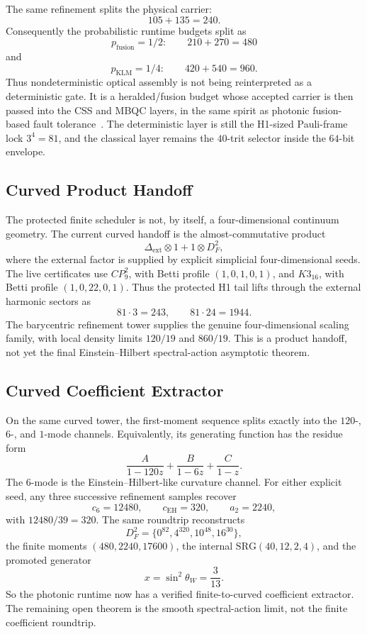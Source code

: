 ﻿\documentclass[12pt]{article}
\begin{document}
The same refinement splits the physical carrier:
\[
105+135=240.
\]
Consequently the probabilistic runtime budgets split as
\[
p_{\mathrm{fusion}}=1/2:\qquad 210+270=480
\]
and
\[
p_{\mathrm{KLM}}=1/4:\qquad 420+540=960.
\]
Thus nondeterministic optical assembly is not being reinterpreted as a
deterministic gate.  It is a heralded/fusion budget whose accepted carrier is
then passed into the CSS and MBQC layers, in the same spirit as photonic fusion-based fault tolerance~\cite{Bartolucci2021}.  The deterministic layer is
still the H1-sized Pauli-frame lock \(3^4=81\), and the classical layer remains
the \(40\)-trit selector inside the \(64\)-bit envelope.

\subsection{Curved Product Handoff}

The protected finite scheduler is not, by itself, a four-dimensional continuum
geometry.  The current curved handoff is the almost-commutative product
\[
\Delta_{\mathrm{ext}}\otimes 1 + 1\otimes D_F^2,
\]
where the external factor is supplied by explicit simplicial four-dimensional
seeds.  The live certificates use \(CP^2_9\), with Betti profile
\((1,0,1,0,1)\), and \(K3_{16}\), with Betti profile \((1,0,22,0,1)\).  Thus the
protected H1 tail lifts through the external harmonic sectors as
\[
81\cdot 3=243,\qquad 81\cdot 24=1944.
\]
The barycentric refinement tower supplies the genuine four-dimensional scaling
family, with local density limits \(120/19\) and \(860/19\).  This is a product
handoff, not yet the final Einstein--Hilbert spectral-action asymptotic theorem.

\subsection{Curved Coefficient Extractor}

On the same curved tower, the first-moment sequence splits exactly into the
\(120\)-, \(6\)-, and \(1\)-mode channels.  Equivalently, its generating function
has the residue form
\[
\frac{A}{1-120z}+\frac{B}{1-6z}+\frac{C}{1-z}.
\]
The \(6\)-mode is the Einstein--Hilbert-like curvature channel.  For either
explicit seed, any three successive refinement samples recover
\[
c_6=12480,\qquad c_{\mathrm{EH}}=320,\qquad a_2=2240,
\]
with \(12480/39=320\).  The same roundtrip reconstructs
\[
D_F^2=\{0^{82},4^{320},10^{48},16^{30}\},
\]
the finite moments \((480,2240,17600)\), the internal
\(\mathrm{SRG}(40,12,2,4)\), and the promoted generator
\[
x=\sin^2\theta_W=\frac{3}{13}.
\]
So the photonic runtime now has a verified finite-to-curved coefficient
extractor.  The remaining open theorem is the smooth spectral-action limit, not
the finite coefficient roundtrip.
\end{document}
